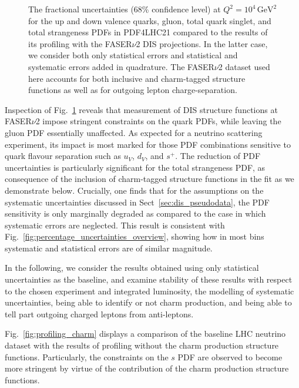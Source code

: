 \begin{figure}[t]
\caption{
The fractional uncertainties (68\% confidence level) at $Q^2 = 10^4 \, \textrm{GeV}^2$ 
for the up and down valence quarks, gluon, total quark singlet, and total strangeness PDFs
in PDF4LHC21 compared to the results of its profiling with the FASER$\nu$2
DIS projections.
%
In the latter case, we consider both only statistical errors and statistical and systematic
errors added in quadrature.
%
The FASER$\nu$2 dataset used here accounts for both  inclusive and charm-tagged structure functions
as well as for outgoing lepton charge-separation.
%
}
\label{fig:profiling_syst}
\end{figure}

Inspection of Fig.~\ref{fig:profiling_syst} reveals that measurement of DIS structure
functions at FASER$\nu$2 impose stringent constraints on the quark PDFs, while leaving
the gluon PDF essentially unaffected.
%
As expected for a neutrino scattering experiment, its impact is most marked for
those PDF combinations sensitive to quark flavour separation such as $u_V$, $d_V$, and
$s^+$.
%
The reduction of PDF uncertainties is particularly significant for the total strangeness PDF,
as  consequence of the inclusion of charm-tagged structure functions in the fit as we demonstrate below.
%
Crucially, one finds that for the assumptions on the systematic uncertainties
discussed in Sect~\ref{sec:dis_pseudodata}, the PDF sensitivity is only marginally degraded
as compared to the case in which systematic errors are neglected.
%
This result is consistent with Fig.~\ref{fig:percentage_uncertainties_overview}, showing
how in most bins systematic and statistical errors are of similar magnitude.

In the following, we consider the results obtained using only statistical uncertainties as the baseline, 
and examine stability of these results with respect to the chosen experiment and integrated luminosity, the modelling of systematic
uncertainties, being able to identify or not charm production, and being able to tell part outgoing
charged leptons from anti-leptons.


%
Fig.~\ref{fig:profiling_charm} displays a comparison of the baseline LHC neutrino dataset with the results
of profiling without the charm production structure functions. 
Particularly, the constraints on the $s$ PDF are observed to become more stringent 
by virtue of the contribution of the charm production structure functions.

